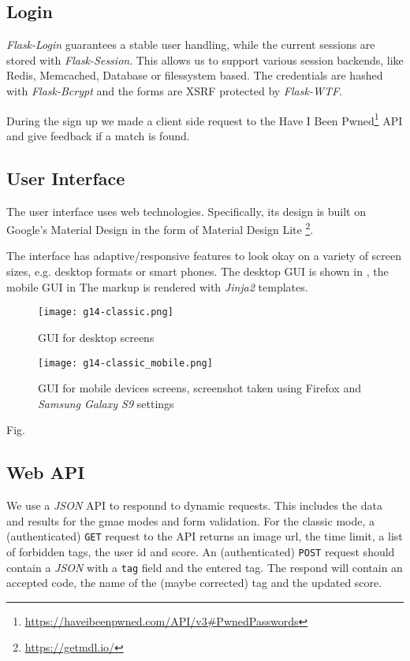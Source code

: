 \subsection{Login}
\label{g14:sec:implementation:login}
\textit{Flask-Login} guarantees a stable user handling, while the current sessions are stored with \textit{Flask-Session}. This allows us to support various session backends, like Redis, Memcached, Database or filessystem based. The credentials are hashed with \textit{Flask-Bcrypt} and the forms are XSRF protected by \textit{Flask-WTF}. 

During the sign up we made a client side request to the Have I Been Pwned\footnote{\url{https://haveibeenpwned.com/API/v3\#PwnedPasswords}} API and give feedback if a match is found.

\subsection{User Interface}
\label{g14:sec:implementation:UI}

The user interface uses web technologies. Specifically, its design is built on Google's Material Design in the form of Material Design Lite \footnote{\url{https://getmdl.io/}}.

The interface has adaptive/responsive features to look okay on a variety of screen sizes, e.g. desktop formats or smart phones. The desktop GUI is shown in , the mobile GUI in 
The markup is rendered with \textit{Jinja2} templates.




\begin{figure}[tb]
\centering
\texttt{[image: g14-classic.png]}
\caption{GUI for desktop screens}
\label{fig:guiclassicdesktop}
\end{figure}


\begin{figure}[tb]
\centering
\texttt{[image: g14-classic\_mobile.png]}
\caption{GUI for mobile devices screens, screenshot taken using Firefox and \textit{Samsung Galaxy S9} settings}
\label{fig:guiclassicmobile}
\end{figure}

Fig. 


\subsection{Web API}
\label{g14:sec:implementation:API}
We use a \textit{JSON} API to responnd to dynamic requests. This includes the data and results for the gmae modes and form validation.
For the classic mode, a (authenticated) \texttt{GET} request to the API returns an image url, the time limit, a list of forbidden tags,  the user id and score.
An (authenticated) \texttt{POST} request should contain a \textit{JSON} with a \texttt{tag} field and the entered tag. The respond will contain an accepted code, the name of the (maybe corrected) tag and the updated score.

